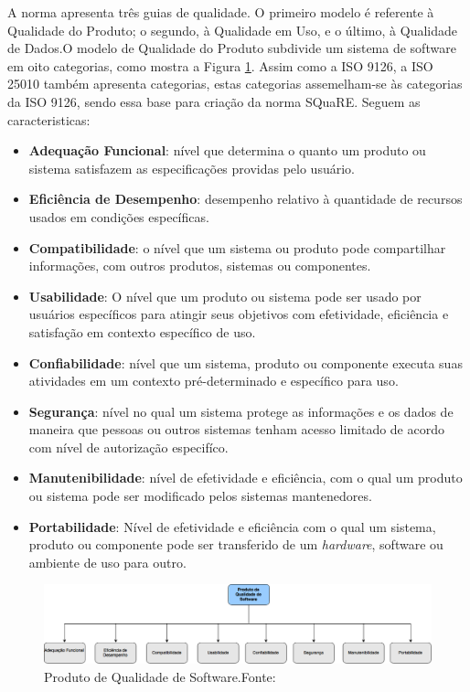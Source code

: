 A norma apresenta três guias de qualidade. O primeiro modelo é referente à Qualidade do Produto; o segundo, à Qualidade em Uso, e o último, à Qualidade de Dados.O modelo de Qualidade do Produto subdivide um sistema de software em oito categorias, como mostra a Figura \ref{img:modelo_square}.
Assim como a ISO 9126, a ISO 25010 também apresenta categorias, estas categorias assemelham-se às categorias da ISO 9126, sendo essa base para criação da norma SQuaRE. Seguem as caracteristicas:

\begin{itemize}
\item \textbf{Adequação Funcional}: nível que determina o quanto um produto ou sistema satisfazem as especificações providas pelo usuário.
\item \textbf{Eficiência de Desempenho}: desempenho relativo à quantidade de recursos usados em condições específicas.
\item \textbf{Compatibilidade}: o nível que um sistema ou produto pode compartilhar informações, com outros produtos, sistemas ou componentes.
\item \textbf{Usabilidade}: O nível que um produto ou sistema pode ser usado por usuários específicos para atingir seus objetivos com efetividade, eficiência e satisfação em contexto específico de uso.
\item \textbf{Confiabilidade}: nível que um sistema, produto ou componente executa suas atividades em um contexto pré-determinado e específico para uso.
\item \textbf{Segurança}: nível no qual um sistema protege as informações e os dados de maneira que pessoas ou outros sistemas tenham acesso limitado de acordo com nível de autorização especifíco.
\item \textbf{Manutenibilidade}: nível de efetividade e eficiência, com o qual um produto ou sistema pode ser modificado pelos sistemas mantenedores.
\item \textbf{Portabilidade}: Nível de efetividade e eficiência com o qual um sistema, produto ou componente pode ser transferido de um \textit{hardware}, software ou ambiente de uso para outro.
\end{itemize}
\graphicspath{{figuras/}}
\begin{figure}[h!]
\centering
\includegraphics[scale=0.40]{SQuaRE}
\caption{Produto de Qualidade de Software.Fonte:\cite{Square}}
\label{img:modelo_square}
\end{figure}

